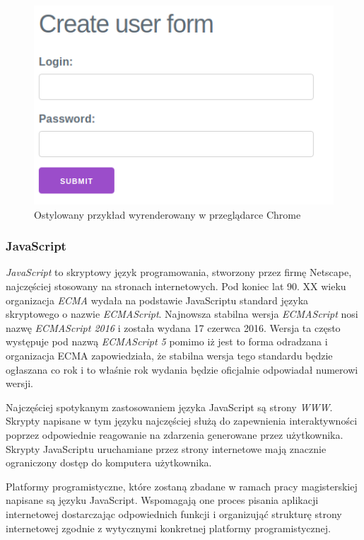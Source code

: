 \documentclass[polish, twoside, 12pt]{mwart}
\begin{document}
\begin{figure}[ht]
  \includegraphics[width=\textwidth]{html-css-chrome.png}
  \caption{Ostylowany przykład wyrenderowany w przeglądarce Chrome}
  \label{fig:example-page-mithril}
\end{figure}

\subsubsection{JavaScript}

\emph{JavaScript} to skryptowy język programowania, stworzony przez firmę Netscape, najczęściej stosowany na stronach internetowych. Pod koniec lat 90. XX wieku organizacja \emph{ECMA} wydała na podstawie JavaScriptu standard języka skryptowego o nazwie \emph{ECMAScript}. Najnowsza stabilna wersja \emph{ECMAScript} nosi nazwę \emph{ECMAScript 2016} \cite{es2016} i została wydana 17 czerwca 2016. Wersja ta często występuje pod nazwą \emph{ECMAScript 5} pomimo iż jest to forma odradzana i organizacja ECMA zapowiedziała, że stabilna wersja tego standardu będzie ogłaszana co rok i to właśnie rok wydania będzie oficjalnie odpowiadał numerowi wersji. 

Najczęściej spotykanym zastosowaniem języka JavaScript są strony \emph{WWW}. Skrypty napisane w tym języku najczęściej służą do zapewnienia interaktywności poprzez odpowiednie reagowanie na zdarzenia generowane przez użytkownika. Skrypty JavaScriptu uruchamiane przez strony internetowe mają znacznie ograniczony dostęp do komputera użytkownika. 

Platformy programistyczne, które zostaną zbadane w ramach pracy magisterskiej napisane są języku JavaScript. Wspomagają one proces pisania aplikacji internetowej dostarczając odpowiednich funkcji i organizująć strukturę strony internetowej zgodnie z wytycznymi konkretnej platformy programistycznej.
\end{document}
